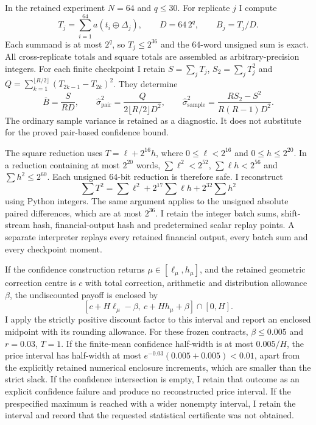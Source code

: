 In the retained experiment $N=64$ and $q\leq30$. For replicate $j$ I compute
\[
 T_j=\sum_{i=1}^{64}a(t_i\oplus\Delta_j),\qquad
 D=64\,2^q,\qquad B_j=T_j/D.
\]
Each summand is at most $2^q$, so $T_j\leq2^{36}$ and the 64-word unsigned
sum is exact. All cross-replicate totals and square totals are assembled
as arbitrary-precision integers. For each finite checkpoint I retain
$S=\sum_jT_j$, $S_2=\sum_jT_j^2$ and
$Q=\sum_{k=1}^{\lfloor R/2\rfloor}(T_{2k-1}-T_{2k})^2$. They determine
\[
 \overline B=\frac{S}{RD},\qquad
 \widehat\sigma_{\mathrm{pair}}^2=
 \frac{Q}{2\lfloor R/2\rfloor D^2},\qquad
 \widehat\sigma_{\mathrm{sample}}^2=
 \frac{RS_2-S^2}{R(R-1)D^2}.
\]
The ordinary sample variance is retained as a diagnostic. It does not
substitute for the proved pair-based confidence bound.

The square reduction uses $T=\ell+2^{16}h$, where
$0\leq\ell<2^{16}$ and $0\leq h\leq2^{20}$. In a reduction containing
at most $2^{20}$ words, $\sum\ell^2<2^{52}$,
$\sum\ell h<2^{56}$ and $\sum h^2\leq2^{60}$.
Each unsigned 64-bit reduction is therefore safe. I reconstruct
\[
 \sum T^2=\sum\ell^2+2^{17}\sum\ell h+2^{32}\sum h^2
\]
using Python integers. The same argument applies to the unsigned absolute
paired differences, which are at most $2^{36}$. I retain the integer batch
sums, shift-stream hash, financial-output hash and predetermined scalar
replay points. A separate interpreter replays every retained financial
output, every batch sum and every checkpoint moment.

If the confidence construction returns $\mu\in[\ell_\mu,h_\mu]$, and the
retained geometric correction centre is $c$ with total correction,
arithmetic and distribution allowance $\beta$, the undiscounted payoff
is enclosed by
\[
 [c+H\ell_\mu-\beta,\ c+Hh_\mu+\beta]\cap[0,H].
\]
I apply the strictly positive discount factor to this interval and report
an enclosed midpoint with its rounding allowance. For these frozen contracts,
$\beta\leq0.005$ and $r=0.03$, $T=1$. If the finite-mean confidence
half-width is at most $0.005/H$, the price interval has half-width at most
$e^{-0.03}(0.005+0.005)<0.01$, apart from the explicitly retained numerical
enclosure increments, which are smaller than the strict slack. If the
confidence intersection is empty, I retain that outcome as an explicit
confidence failure and produce no reconstructed price interval. If the
prespecified maximum is reached with a wider nonempty interval, I retain
the interval and record that the requested statistical certificate was
not obtained.
